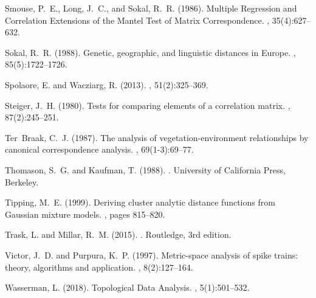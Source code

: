 \documentclass[a4]{article}
\newcommand{\+}[1]{\mathbf{#1}}
\begin{document}
\begin{thebibliography}{}
Smouse, P.~E., Long, J.~C., and Sokal, R.~R. (1986).
\newblock Multiple {{Regression}} and {{Correlation Extensions}} of the
  {{Mantel Test}} of {{Matrix Correspondence}}.
, 35(4):627--632.

Sokal, R.~R. (1988).
\newblock Genetic, geographic, and linguistic distances in {{Europe}}.
,
  85(5):1722--1726.

Spolaore, E. and Wacziarg, R. (2013).
, 51(2):325--369.

Steiger, J.~H. (1980).
\newblock Tests for comparing elements of a correlation matrix.
, 87(2):245--251.

Ter~Braak, C.~J. (1987).
\newblock The analysis of vegetation-environment relationships by canonical
  correspondence analysis.
, 69(1-3):69--77.

Thomason, S.~G. and Kaufman, T. (1988).
.
\newblock University of California Press, Berkeley.

Tipping, M.~E. (1999).
\newblock Deriving cluster analytic distance functions from {{Gaussian}}
  mixture models.
, pages 815--820.

Trask, L. and Millar, R.~M. (2015).
.
\newblock Routledge, 3rd edition.

Victor, J.~D. and Purpura, K.~P. (1997).
\newblock Metric-space analysis of spike trains: theory, algorithms and
  application.
, 8(2):127--164.

Wasserman, L. (2018).
\newblock Topological {{Data Analysis}}.
, 5(1):501--532.


\end{thebibliography}
\end{document}
